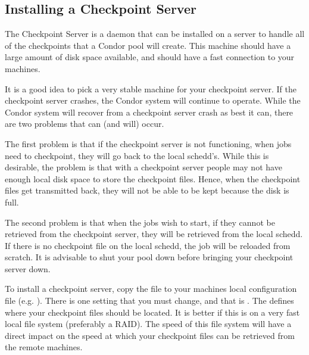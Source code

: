 \subsection{Installing a Checkpoint Server}
\label{sec:Ckpt-Server}

The Checkpoint Server is a daemon that can be installed on a server to
handle all of the checkpoints that a Condor pool will create.
This machine should have a large amount of disk space available, and
should have a fast connection to your machines.

\Note It is a good idea to pick a very stable machine for your checkpoint
server.
If the checkpoint server crashes, the Condor system will continue to
operate.
While the Condor system will recover from a checkpoint server crash
as best it can, there are two problems that can (and will) occur.

The first problem is that if the checkpoint server is not functioning,
when jobs need to checkpoint, they will go back to the local schedd's.
While this is desirable, the problem is that with a checkpoint server
people may not have enough local disk space to store the checkpoint
files.
Hence, when the checkpoint files get transmitted back, they will not
be able to be kept because the disk is full.

The second problem is that when the jobs wish to start, if they cannot
be retrieved from the checkpoint server, they will be retrieved from the
local schedd.
If there is no checkpoint file on the local schedd, the job will be reloaded
from scratch.
It is advisable to shut your pool down before bringing your checkpoint
server down.

To install a checkpoint server, copy the file 
to your machines local configuration file (e.g. ).
There is one setting that you must change, and that is .
The  defines where your checkpoint files should be located.
It is better if this is on a very fast local file system (preferably a RAID).
The speed of this file system will have a direct impact on the speed at which your
checkpoint files can be retrieved from the remote machines.

